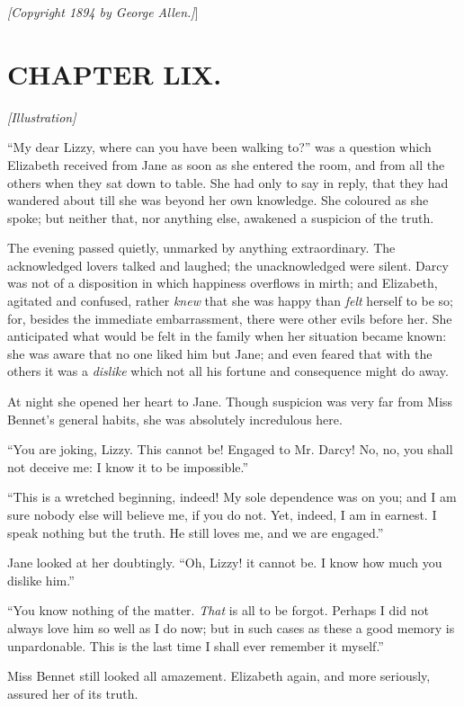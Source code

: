 \documentclass[12pt]{book}
\begin{document}
\emph{[\textit{Copyright 1894 by George Allen.}]}]

\chapter{CHAPTER LIX.}

\emph{[Illustration]}

``My dear Lizzy, where can you have been walking to?'' was a question which Elizabeth received from Jane as soon as she entered the room, and from all the others when they sat down to table. She had only to say in reply, that they had wandered about till she was beyond her own knowledge. She coloured as she spoke; but neither that, nor anything else, awakened a suspicion of the truth.

The evening passed quietly, unmarked by anything extraordinary. The acknowledged lovers talked and laughed; the unacknowledged were silent. Darcy was not of a disposition in which happiness overflows in mirth; and Elizabeth, agitated and confused, rather \textit{knew} that she was happy than \textit{felt} herself to be so; for, besides the immediate embarrassment, there were other evils before her. She anticipated what would be felt in the family when her situation became known: she was aware that no one liked him but Jane; and even feared that with the others it was a \textit{dislike} which not all his fortune and consequence might do away.

At night she opened her heart to Jane. Though suspicion was very far from Miss Bennet's general habits, she was absolutely incredulous here.

``You are joking, Lizzy. This cannot be! Engaged to Mr. Darcy! No, no, you shall not deceive me: I know it to be impossible.''

``This is a wretched beginning, indeed! My sole dependence was on you; and I am sure nobody else will believe me, if you do not. Yet, indeed, I am in earnest. I speak nothing but the truth. He still loves me, and we are engaged.''

Jane looked at her doubtingly. ``Oh, Lizzy! it cannot be. I know how much you dislike him.''

``You know nothing of the matter. \textit{That} is all to be forgot. Perhaps I did not always love him so well as I do now; but in such cases as these a good memory is unpardonable. This is the last time I shall ever remember it myself.''

Miss Bennet still looked all amazement. Elizabeth again, and more seriously, assured her of its truth.
\end{document}
